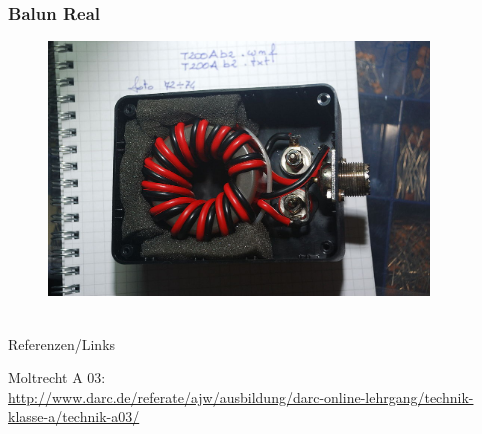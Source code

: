 \begin{frame}
  \frametitle{Balun Real}
  \begin{center}
    \begin{figure}
      \includegraphics[width=0.9\textwidth,height=.75\textheight,keepaspectratio]{a03/balun-Real.jpg}
    \end{figure}
  \end{center}
\end{frame}


\renewcommand{\refname}{Referenzen}

\hypertarget{refs}{}
\textcolor{white}{} \\ %
\Large Referenzen/Links
\footnotesize

\begin{thebibliography}{}
   Moltrecht A 03: \\
    \url{http://www.darc.de/referate/ajw/ausbildung/darc-online-lehrgang/technik-klasse-a/technik-a03/}

\end{thebibliography}


